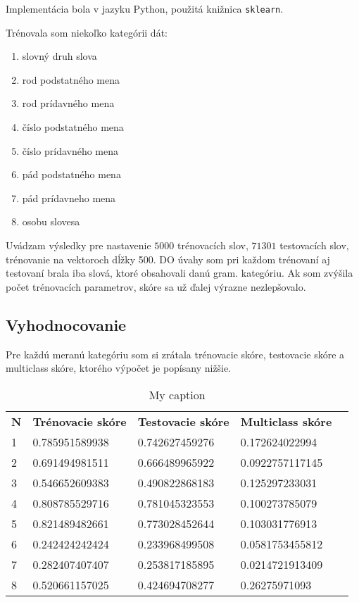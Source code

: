 \documentclass[12pt]{article}
\begin{document}
Implementácia bola v jazyku Python, použitá knižnica \texttt{sklearn}. 

Trénovala som niekoľko kategórii dát:
\begin{enumerate}
\item slovný druh slova
\item rod podstatného mena
\item rod prídavného mena
\item číslo podstatného mena
\item číslo prídavného mena
\item pád podstatného mena
\item pád prídavneho mena
\item osobu slovesa\
\end{enumerate}
Uvádzam výsledky pre nastavenie $5000$ trénovacích slov, $71301$ testovacích slov, trénovanie na vektoroch dĺžky 500. DO úvahy som pri každom trénovaní aj testovaní brala iba slová, ktoré obsahovali danú gram. kategóriu. Ak som zvýšila počet trénovacích parametrov, skóre sa už ďalej výrazne nezlepšovalo. 

\subsection{Vyhodnocovanie}

Pre každú meranú kategóriu som si zrátala trénovacie skóre, testovacie skóre a multiclass skóre, ktorého výpočet je popísany nižšie. 


\begin{table}[]
\centering
\caption{My caption}
\label{my-label}
\begin{tabular}{lllll}
\textbf{N} & \textbf{Trénovacie skóre} & \textbf{Testovacie skóre} & \textbf{Multiclass skóre} & \textbf{} \\
1          & 0.785951589938            & 0.742627459276            & 0.172624022994            &           \\
2          & 0.691494981511            & 0.666489965922            & 0.0922757117145           &           \\
3          & 0.546652609383            & 0.490822868183            & 0.125297233031            &         \\
4          & 0.808785529716            & 0.781045323553            & 0.100273785079            &           \\
5          & 0.821489482661            & 0.773028452644            & 0.103031776913          &           \\
6          & 0.242424242424            & 0.233968499508            & 0.0581753455812            &         \\ 
7          & 0.282407407407            & 0.253817185895            & 0.0214721913409          &           \\
8          & 0.520661157025            & 0.424694708277            & 0.26275971093            &         \\ 
\end{tabular}
\end{table}
\end{document}
